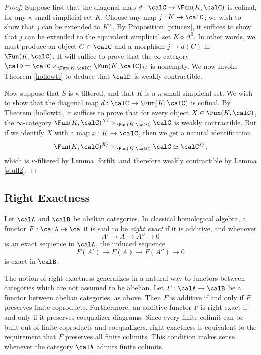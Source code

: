 \begin{proof}
Suppose first that the diagonal map $d: \calC \rightarrow \Fun(K,\calC)$ is cofinal, for any $\kappa$-small simplicial set $K$. Choose any map $j: K \rightarrow \calC$; we wish to show that $j$ can be extended to $K^{\triangleright}$. By Proposition \ref{princex}, it suffices to show that $j$ can be extended to the equivalent simplicial set $K \diamond \Delta^0$. In other words, we must produce
an object $C \in \calC$ and a morphism $j \rightarrow d(C)$ in $\Fun(K,\calC)$. It will suffice to prove that
the $\infty$-category $\calD = \calC \times_{ \Fun(K,\calC) } \Fun(K,\calC)_{j/}$ is nonempty. We now invoke Theorem \ref{hollowtt} to deduce that $\calD$ is weakly contractible.

Now suppose that $S$ is $\kappa$-filtered, and that $K$ is a $\kappa$-small simplicial set.
We wish to show that the diagonal map $d: \calC \rightarrow \Fun(K,\calC)$ is cofinal. By Theorem \ref{hollowtt}, it suffices to prove that for every object $X \in \Fun(K,\calC)$, the $\infty$-category
$\Fun(K,\calC)^{X/} \times_{\Fun(K,\calC)} \calC$ is weakly contractible. But if we identify $X$ with a map
$x: K \rightarrow \calC$, then we get a natural identification
$$ \Fun(K,\calC)^{X/} \times_{ \Fun(K,\calC) } \calC \simeq \calC^{x/},$$ which is $\kappa$-filtered
by Lemma \ref{forfilt} and therefore weakly contractible by Lemma \ref{stull2}.
\end{proof}

\subsection{Right Exactness}\label{rexex}

Let $\calA$ and $\calB$ be abelian categories. In classical homological algebra, a functor $F: \calA \rightarrow \calB$ is said to be
{\it right exact} if it is additive, and whenever
$$A' \rightarrow A \rightarrow A'' \rightarrow 0$$
is an exact sequence in $\calA$, the induced sequence
$$F(A') \rightarrow F(A) \rightarrow F(A'') \rightarrow 0$$
is exact in $\calB$.

The notion of right exactness generalizes in a natural way to functors between categories which are not assumed to be abelian. Let $F: \calA \rightarrow \calB$ be a functor between abelian categories, as above. Then $F$ is additive if and only if $F$ preserves finite coproducts. Furthermore, an additive functor $F$ is right exact if and only if it preserves coequalizer diagrams. Since every finite colimit can be built out of finite coproducts and coequalizers, right exactness is equivalent to the requirement that $F$ preserves all finite colimits. This condition makes sense whenever the category $\calA$ admits finite colimits.

